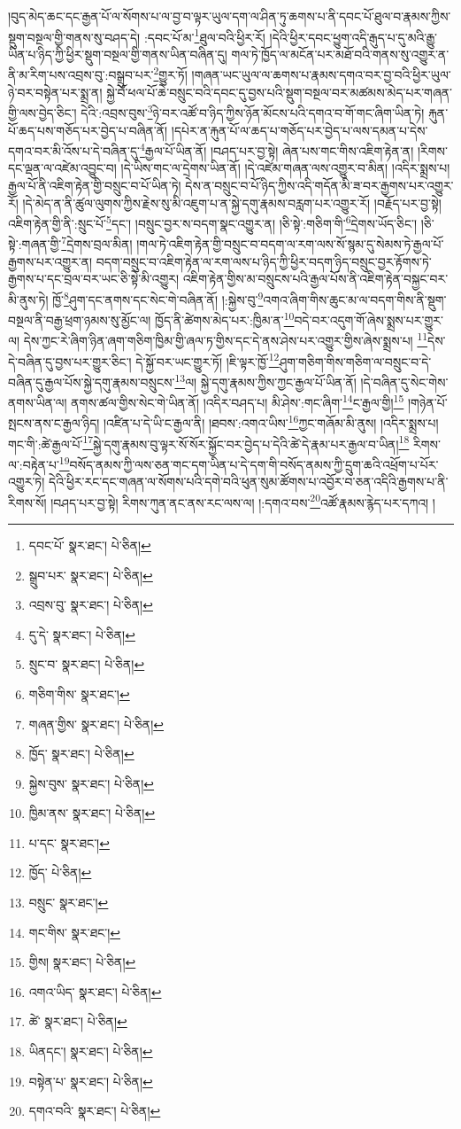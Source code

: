།བུད་མེད་ཆང་དང་རྒྱན་པོ་ལ་སོགས་པ་ལ་བྱ་བ་ལྟར་ཡུལ་དག་ལ་ཤིན་ཏུ་ཆགས་པ་ནི་དབང་པོ་ཐུལ་བ་རྣམས་ཀྱིས་སྡུག་བསྔལ་གྱི་གནས་སུ་བཤད་དེ། :དབང་པོ་མ་\footnote{དབང་པོ་  སྣར་ཐང་།  པེ་ཅིན། }ཐུལ་བའི་ཕྱིར་རོ། །དེའི་ཕྱིར་དབང་ཕྱུག་འདི་རྒུད་པ་དུ་མའི་རྒྱུ་ཡིན་པ་ཉིད་ཀྱི་ཕྱིར་སྡུག་བསྔལ་གྱི་གནས་ཡིན་བཞིན་དུ། གལ་ཏེ་ཁྱོད་ལ་མངོན་པར་མཐོ་བའི་གནས་སུ་འགྱུར་ན་ནི་མ་རིག་པས་འབྲས་བུ་:བསྒྲུབ་པར་\footnote{སྒྲུབ་པར་  སྣར་ཐང་།  པེ་ཅིན། }གྱུར་ཏོ། །གཞན་ཡང་ཡུལ་ལ་ཆགས་པ་རྣམས་དགའ་བར་བྱ་བའི་ཕྱིར་ཡུལ་ཉེ་བར་བསྟེན་པར་སྨྲ་ན། སྐྱེ་བོ་ཕལ་པོ་ཆེ་བསྲུང་བའི་དབང་དུ་བྱས་པའི་སྡུག་བསྔལ་བར་མཚམས་མེད་པར་གཞན་གྱི་ལས་བྱེད་ཅིང་། དེའི་:འབྲས་བུས་\footnote{འབྲས་བུ་  སྣར་ཐང་།  པེ་ཅིན། }ཉེ་བར་འཚོ་བ་ཉིད་ཀྱིས་ཉོན་མོངས་པའི་དགའ་བ་གོ་གང་ཞིག་ཡིན་ཏེ། རྐུན་པོ་ཆད་པས་གཅོད་པར་བྱེད་པ་བཞིན་ནོ། །དཔེར་ན་རྐུན་པོ་ལ་ཆད་པ་གཅོད་པར་བྱེད་པ་ལས་དམན་པ་དེས་དགའ་བར་མི་འོས་པ་དེ་བཞིན་དུ་\footnote{དུ་དེ་  སྣར་ཐང་།  པེ་ཅིན། }རྒྱལ་པོ་ཡིན་ནོ། །བཤད་པར་བྱ་སྟེ། ཞེན་པས་གང་གིས་འཇིག་རྟེན་ན། །རིགས་དང་ལྡན་ལ་འཛེམ་འབྱུང་བ། །དེ་ཡིས་གང་ལ་དྲེགས་ཡིན་ནོ། །དེ་འཛེམ་གཞན་ལས་འགྱུར་བ་མིན། །འདིར་སྨྲས་པ། རྒྱལ་པོ་ནི་འཇིག་རྟེན་གྱི་བསྲུང་བ་པོ་ཡིན་ཏེ། དེས་ན་བསྲུང་བ་པོ་ཉིད་ཀྱིས་འདི་གདོན་མི་ཟ་བར་རྒྱགས་པར་འགྱུར་རོ། །དེ་མེད་ན་ནི་ཚུལ་ལུགས་ཀྱིས་རྗེས་སུ་མི་འཇུག་པ་ན་སྐྱེ་དགུ་རྣམས་བརླག་པར་འགྱུར་རོ། །བརྗོད་པར་བྱ་སྟེ། འཇིག་རྟེན་གྱི་ནི་:སྲུང་པོ་\footnote{སྲུང་བ་  སྣར་ཐང་།  པེ་ཅིན། }དང་། །བསྲུང་བྱར་ས་བདག་སྣང་འགྱུར་ན། །ཅི་སྟེ་:གཅིག་གི་\footnote{གཅིག་གིས་  སྣར་ཐང་། }དྲེགས་ཡོད་ཅིང་། །ཅི་སྟེ་:གཞན་གྱི་\footnote{གཞན་གྱིས་  སྣར་ཐང་།  པེ་ཅིན། }དྲེགས་བྲལ་མིན། །གལ་ཏེ་འཇིག་རྟེན་གྱི་བསྲུང་བ་བདག་ལ་རག་ལས་སོ་སྙམ་དུ་སེམས་ཏེ་རྒྱལ་པོ་རྒྱགས་པར་འགྱུར་ན། བདག་བསྲུང་བ་འཇིག་རྟེན་ལ་རག་ལས་པ་ཉིད་ཀྱི་ཕྱིར་བདག་ཉིད་བསྲུང་བྱར་རྟོགས་ཏེ་རྒྱགས་པ་དང་བྲལ་བར་ཡང་ཅི་སྟེ་མི་འགྱུར། འཇིག་རྟེན་གྱིས་མ་བསྲུངས་པའི་རྒྱལ་པོས་ནི་འཇིག་རྟེན་བསྐྱང་བར་མི་ནུས་ཏེ། ཁྱོ་\footnote{ཁྱོད་  སྣར་ཐང་།  པེ་ཅིན། }ཤུག་དང་ནགས་དང་སེང་གེ་བཞིན་ནོ། །:སྐྱེས་བུ་\footnote{སྐྱེས་བུས་  སྣར་ཐང་།  པེ་ཅིན། }འགའ་ཞིག་གིས་ཆུང་མ་ལ་བདག་གིས་ནི་སྡུག་བསྔལ་ནི་བརྒྱ་ཕྲག་ཉམས་སུ་མྱོང་ལ། ཁྱོད་ནི་ཚེགས་མེད་པར་:ཁྱིམ་ན་\footnote{ཁྱིམ་ནས་  སྣར་ཐང་།  པེ་ཅིན། }བདེ་བར་འདུག་གོ་ཞེས་སྨྲས་པར་གྱུར་ལ། དེས་ཀྱང་རེ་ཞིག་ཉིན་ཞག་གཅིག་ཁྱིམ་གྱི་ཞལ་ཏ་གྱིས་དང་དེ་ནས་ཤེས་པར་འགྱུར་གྱིས་ཞེས་སྨྲས་པ། \footnote{པ་དང་  སྣར་ཐང་། }དེས་དེ་བཞིན་དུ་བྱས་པར་གྱུར་ཅིང་། དེ་སྐྱོ་བར་ཡང་གྱུར་ཏོ། །ཇི་ལྟར་ཁྱོ་\footnote{ཁྱོད་  པེ་ཅིན། }ཤུག་གཅིག་གིས་གཅིག་ལ་བསྲུང་བ་དེ་བཞིན་དུ་རྒྱལ་པོས་སྐྱེ་དགུ་རྣམས་བསྲུངས་\footnote{བསྲུང་  སྣར་ཐང་། }ལ། སྐྱེ་དགུ་རྣམས་ཀྱིས་ཀྱང་རྒྱལ་པོ་ཡིན་ནོ། །དེ་བཞིན་དུ་སེང་གེས་ནགས་ཡིན་ལ། ནགས་ཚལ་གྱིས་སེང་གེ་ཡིན་ནོ། །འདིར་བཤད་པ། མི་ཤེས་:གང་ཞིག་\footnote{གང་གིས་  སྣར་ཐང་། }ང་རྒྱལ་གྱི།\footnote{གྱིས།  སྣར་ཐང་།  པེ་ཅིན། } །གཉེན་པོ་སྤངས་ནས་ང་རྒྱལ་ཉིད། །འཛིན་པ་དེ་ཡི་ང་རྒྱལ་ནི། །ཐབས་:འགའ་ཡིས་\footnote{འགའ་ཡིད་  སྣར་ཐང་།  པེ་ཅིན། }ཀྱང་གཞོམ་མི་ནུས། །འདིར་སྨྲས་པ། གང་གི་:ཚེ་རྒྱལ་པོ་\footnote{ཚེ་  སྣར་ཐང་།  པེ་ཅིན། }སྐྱེ་དགུ་རྣམས་བུ་ལྟར་སོ་སོར་སྐྱོང་བར་བྱེད་པ་དེའི་ཚེ་དེ་རྣམ་པར་རྒྱལ་བ་ཡིན།\footnote{ཡིནདང་།  སྣར་ཐང་།  པེ་ཅིན། } རིགས་ལ་:བརྟེན་པ་\footnote{བསྟེན་པ་  སྣར་ཐང་།  པེ་ཅིན། }བསོད་ནམས་ཀྱི་ལས་ཅན་གང་དག་ཡིན་པ་དེ་དག་གི་བསོད་ནམས་ཀྱི་དྲུག་ཆའི་འཕྲོག་པ་པོར་འགྱུར་ཏེ། དེའི་ཕྱིར་རང་དང་གཞན་ལ་སོགས་པའི་དགེ་བའི་ཕུན་སུམ་ཚོགས་པ་འབྱོར་བ་ཅན་འདིའི་རྒྱགས་པ་ནི་རིགས་སོ། །བཤད་པར་བྱ་སྟེ། རིགས་ཀུན་ནང་ནས་རང་ལས་ལ། །:དགའ་བས་\footnote{དགའ་བའི་  སྣར་ཐང་།  པེ་ཅིན། }འཚོ་རྣམས་རྙེད་པར་དཀའ། །
